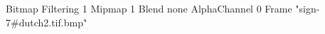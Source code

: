 {Bitmap
	{Filtering 1}
	{Mipmap 1}
	{Blend none}
	{AlphaChannel 0}
	{Frame "sign-7#dutch2.tif.bmp"}
}
